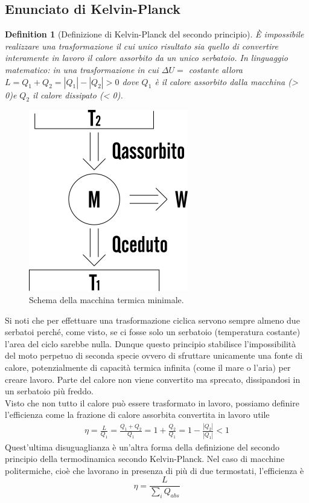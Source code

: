 \documentclass[10pt,a4paper]{article}
\newtheorem{definition}{Definition}
\begin{document}
\subsection{Enunciato di Kelvin-Planck}
\begin{definition}[Definizione di Kelvin-Planck del secondo principio]
	È impossibile realizzare una trasformazione il cui unico risultato sia quello di convertire interamente in lavoro il calore assorbito da un unico serbatoio. In linguaggio matematico: in una trasformazione in cui $\Delta U =$ costante allora \(L = Q_1+Q_2 = |Q_1| - |Q_2|> 0\) dove $Q_1$ è il calore assorbito dalla macchina (> 0)e $Q_2$ il calore dissipato (< 0).
\end{definition}
\begin{figure}[h!]
	\centering
	\includegraphics[width=0.3\linewidth]{../images/macchina-termica}
	\caption{Schema della macchina termica minimale.}
	\label{fig:macchina-termica}
\end{figure}
\FloatBarrier
Si noti che per effettuare una trasformazione ciclica servono sempre almeno due serbatoi perché, come visto, se ci fosse solo un serbatoio (temperatura costante) l'area del ciclo sarebbe nulla. Dunque questo principio stabilisce l'impossibilità del moto perpetuo di seconda specie ovvero di sfruttare unicamente una fonte di calore, potenzialmente di capacità termica infinita (come il mare o l'aria) per creare lavoro. Parte del calore non viene convertito ma sprecato, dissipandosi in un serbatoio più freddo. \\
Visto che non tutto il calore può essere trasformato in lavoro, possiamo definire l'efficienza come la frazione di calore assorbita convertita in lavoro utile
\begin{align*}
	\eta = \frac{L}{Q_1} = \frac{Q_1 + Q_2}{Q_1} = 1 + \frac{Q_2}{Q_1} = 1- \frac{|Q_2|}{|Q_1|}< 1
\end{align*}
Quest'ultima disuguaglianza è un'altra forma della definizione del secondo principio della termodinamica secondo Kelvin-Planck. Nel caso di macchine politermiche, cioè che lavorano in presenza di più di due termostati, l'efficienza è 
\[\eta = \frac{L}{\sum_i Q_{abs}}\]
\end{document}
